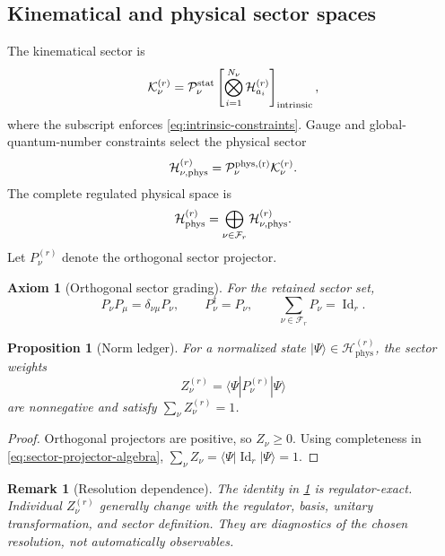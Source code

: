 \documentclass[11pt]{article}
\newtheorem{axiom}[definition]{Axiom}
\newtheorem{proposition}[definition]{Proposition}
\newtheorem{remark}[definition]{Remark}
\newcommand{\Id}{\operatorname{Id}}
\newcommand{\Hil}{\mathcal H}
\newcommand{\Kin}{\mathcal K}
\newcommand{\Phys}{\mathcal H_{\mathrm{phys}}}
\newcommand{\cP}{\mathcal P}
\newcommand{\cF}{\mathcal F}
\begin{document}
\subsection{Kinematical and physical sector spaces}

The kinematical sector is
\begin{equation}
 \Kin_\nu^{(r)}
 =\cP_\nu^{\rm stat}
 \left[
 \bigotimes_{i=1}^{N_\nu}\Hil_{a_i}^{(r)}
 \right]_{\rm intrinsic},
\label{eq:kinematical-sector}
\end{equation}
where the subscript enforces
\cref{eq:intrinsic-constraints}.  Gauge and global-quantum-number constraints
select the physical sector
\begin{equation}
 \Hil_{\nu,\rm phys}^{(r)}
 =\cP_{\nu}^{\rm phys,(r)}\Kin_\nu^{(r)}.
\label{eq:physical-sector}
\end{equation}
The complete regulated physical space is
\begin{equation}
 \Phys^{(r)}
 =\bigoplus_{\nu\in\cF_r}\Hil_{\nu,\rm phys}^{(r)}.
\label{eq:graded-physical-space}
\end{equation}
Let \(P_\nu^{(r)}\) denote the orthogonal sector projector.

\begin{axiom}[Orthogonal sector grading]
\label{ax:orthogonal-sectors}
For the retained sector set,
\begin{equation}
 P_\nu P_\mu=\delta_{\nu\mu}P_\nu,
 \qquad
 P_\nu^\dagger=P_\nu,
 \qquad
 \sum_{\nu\in\cF_r}P_\nu=\Id_r.
\label{eq:sector-projector-algebra}
\end{equation}
\end{axiom}

\begin{proposition}[Norm ledger]
\label{prop:norm-ledger}
For a normalized state \(|\Psi\rangle\in\Phys^{(r)}\), the sector weights
\begin{equation}
 Z_\nu^{(r)}=\langle\Psi|P_\nu^{(r)}|\Psi\rangle
\label{eq:sector-weight}
\end{equation}
are nonnegative and satisfy \(\sum_\nu Z_\nu^{(r)}=1\).
\end{proposition}

\begin{proof}
Orthogonal projectors are positive, so \(Z_\nu\ge0\).  Using completeness in
\cref{eq:sector-projector-algebra},
\(\sum_\nu Z_\nu=\langle\Psi|\Id_r|\Psi\rangle=1\).
\end{proof}

\begin{remark}[Resolution dependence]
The identity in \cref{prop:norm-ledger} is regulator-exact.  Individual
\(Z_\nu^{(r)}\) generally change with the regulator, basis, unitary
transformation, and sector definition.  They are diagnostics of the chosen
resolution, not automatically observables.
\end{remark}
\end{document}

